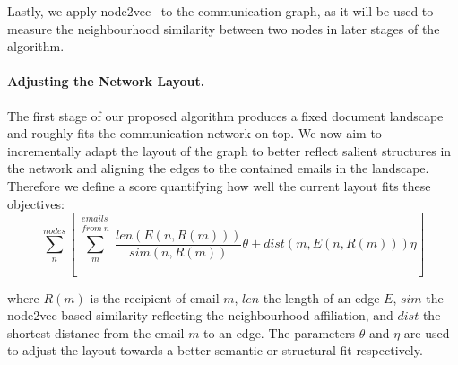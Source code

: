 
Lastly, we apply node2vec~\cite{grover2016node2vec} to the communication graph, as it will be used to measure the neighbourhood similarity between two nodes in later stages of the algorithm.

\paragraph{Adjusting the Network Layout.}
The first stage of our proposed algorithm produces a fixed document landscape and roughly fits the communication network on top. 
We now aim to incrementally adapt the layout of the graph to better reflect salient structures in the network and aligning the edges to the contained emails in the landscape.
Therefore we define a score quantifying how well the current layout fits these objectives:
\begin{equation}
\sum_{n}^{nodes}\left[\sum_{m}^{\substack{emails\\from~n}}\frac{len(E(n, R(m)))}{sim(n, R(m))}\theta+dist(m, E(n,R(m)))\eta\right]
\label{eq:score}
\end{equation}

where $R(m)$ is the recipient of email $m$, $len$ the length of an edge $E$, $sim$ the node2vec based similarity reflecting the neighbourhood affiliation, and $dist$ the shortest distance from the email $m$ to an edge. The parameters $\theta$ and $\eta$ are used to adjust the layout towards a better semantic or structural fit respectively.


